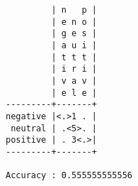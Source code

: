 \begin{verbatim}
         | n   p |
         | e n o |
         | g e s |
         | a u i |
         | t t t |
         | i r i |
         | v a v |
         | e l e |
---------+-------+
negative |<.>1 . |
 neutral | .<5>. |
positive | . 3<.>|
---------+-------+

Accuracy : 0.555555555556
\end{verbatim}
